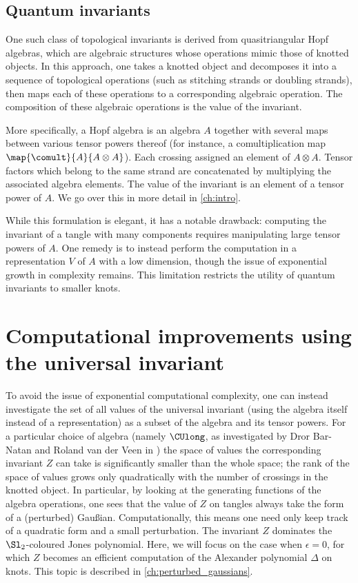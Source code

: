 \subsection{Quantum invariants}

One such class of topological invariants is derived from quasitriangular Hopf
algebras, which are algebraic structures whose operations mimic those of knotted
objects. In this approach, one takes a knotted object and decomposes it into a
sequence of topological operations (such as stitching strands or doubling
strands), then maps each of these operations to a corresponding algebraic
operation. The composition of these algebraic operations is the value of the
invariant.

More specifically, a Hopf algebra is an algebra $A$ together with several maps
between various tensor powers thereof (for instance, a comultiplication map
$\map {\comult} {A} {A \otimes A}$). Each crossing assigned an element of $A
\otimes A$. Tensor factors which belong to the same strand are concatenated by
multiplying the associated algebra elements. The value of the invariant is an
element of a tensor power of $A$. We go over this in more detail in
\cref{ch:intro}.

While this formulation is elegant, it has a notable drawback: computing the
invariant of a tangle with many components requires manipulating
large tensor powers of $A$. One remedy is to instead perform the computation in
a representation $V$ of $A$ with a low dimension, though the issue of
exponential growth in complexity remains. This limitation restricts the utility
of quantum invariants to smaller knots.

\section{Computational improvements using the universal invariant}
To avoid the issue of exponential computational complexity, one can instead
investigate the set of all values of the universal invariant (using the algebra
itself instead of a representation) as a subset of the algebra and its tensor
powers. For a particular choice of algebra (namely $\CUlong$, as investigated by
Dror Bar-Natan and Roland van der Veen in \cite{BV}) the space of values the
corresponding invariant $Z$ can take is significantly smaller than the whole
space; the rank of the space of values grows only quadratically with the number
of crossings in the knotted object. In particular, by looking at the generating
functions of the algebra operations, one sees that the value of $Z$ on tangles
always take the form of a (perturbed) Gaußian. Computationally, this means one
need only keep track of a quadratic form and a small perturbation. The invariant
$Z$ dominates the $\Sl_2$-coloured Jones polynomial. Here, we will focus on the
case when $ϵ=0$, for which $Z$ becomes an efficient computation of the Alexander
polynomial $Δ$ on knots. This topic is described in
\cref{ch:perturbed_gaussians}.

